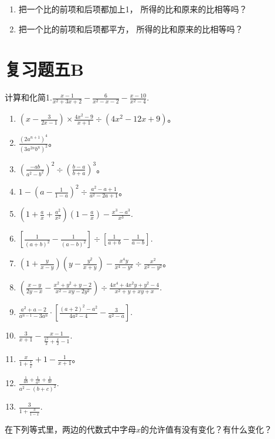 \begin{enumerate}[start=36]
\item
  把一个比的前项和后项都加上1， 所得的比和原来的比相等吗？
\item
  把一个比的前项和后项都平方， 所得的比和原来的比相等吗？
\end{enumerate}

\section{复习题五B}

计算和化简1.\(\frac{x - 1}{x^2 + 3x + 2} -\frac{6}{x^2 - x - 2} -\frac{x - 10}{x^2 - 4}.\)
\begin{enumerate}[start=2]
\item
  \(\left(x - \frac{3}{2x - 1}\right) \times \frac{4x^2 - 9}{x + 1} \div (4x^2 - 12x + 9)\)。
\item
  \(\frac{(2a^{n+1})^4}{(3a^{2n}b^n)^2}\)。
\item
  \(\left(\frac{-ab}{a^2 - b^2}\right)^2 \div \left(\frac{b - a}{b + a}\right)^3\)。
\item
  \(1 - \left(a - \frac{1}{1 - a}\right)^2 \div \frac{a^2 - a + 1}{a^2 - 2a + 1}\)。
\item
  \(\left(1 + \frac{a}{x} +\frac{a^2}{x^2}\right)\left(1 - \frac{a}{x}\right) - \frac{x^3 - a^3}{x^3}.\)
\item
  \(\left[\frac{1}{(a + b)^2} -\frac{1}{(a - b)^2}\right]\div \left[\frac{1}{a + b} -\frac{1}{a - b}\right].\)
\item
  \(\left(1 + \frac{y}{x - y}\right)\left(y - \frac{y^2}{x + y}\right) - \frac{x^4y}{x^4 - y^4} \div \frac{x^2}{x^2 - y^2}\)。
\item
  \(\left(\frac{x - y}{2y - x} -\frac{x^2 + y^2 + y - 2}{x^2 - xy - 2y^2}\right)\div \frac{4x^4 + 4x^2y + y^2 - 4}{x^2 + y + xy + x}.\)
\item
  \(\frac{a^2 + a - 2}{a^{n - 1} - 3a^n}\cdot \left[\frac{(a + 2)^2 - a^2}{4a^2 - 4} -\frac{3}{a^2 - a}\right].\)
\item
  \(\frac{3}{x + 1} -\frac{x - 1}{\frac{x^2}{2} + \frac{x}{2} - 1}.\)
\item
  \(\frac{x}{1 + \frac{1}{x}} + 1 - \frac{1}{x + 1}\)。
\item
  \(\frac{\frac{1}{ab} + \frac{1}{a^2} + \frac{1}{bc}}{a^2 - (b + c)^2}.\)
\item
  \(\frac{3}{1 + \frac{3}{1 - x}}.\)
\end{enumerate}

在下列等式里，两边的代数式中字母\(x\)的允许值有没有变化？有什么变化？

